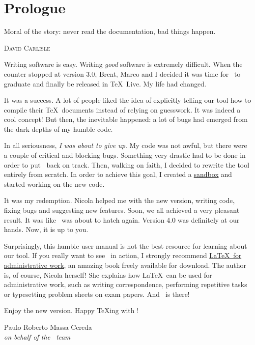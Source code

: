 \chapter*{Prologue}
\label{chap:prologue}

\epigraph{Moral of the story: never read the
documentation, bad things happen.}{\textsc{David Carlisle}}

{\setlength{\parskip}{1em}
Writing software is easy. Writing \emph{good} software is extremely difficult. When the counter stopped at version 3.0, Brent, Marco and I decided it was time for \arara\ to graduate and finally be released in \TeX\ Live. My life had changed.

It was a success. A lot of people liked the idea of explicitly telling our tool how to compile their \TeX\ documents instead of relying on guesswork. It was indeed a cool concept! But then, the inevitable happened: a lot of bugs had emerged from the dark depths of my humble code.

In all seriousness, \emph{I was about to give up}. My code was not awful, but there were a couple of critical and blocking bugs. Something very drastic had to be done in order to put \arara\ back on track. Then, walking on faith, I decided to rewrite the tool entirely from scratch. In order to achieve this goal, I created a \href{https://github.com/cereda/nightingale}{sandbox} and started working on the new code.

It was my redemption. Nicola helped me with the new version, writing code, fixing bugs and suggesting new features. Soon, we all achieved a very pleasant result. It was like \arara\ was about to hatch again. Version 4.0 was definitely at our hands. Now, it is up to you.

Surprisingly, this humble user manual is not the best resource for learning about our tool. If you really want to see \arara\ in action, I strongly recommend \href{https://www.dickimaw-books.com/latex/admin}{\LaTeX\ for administrative work}, an amazing book freely available for download. The author is, of course, Nicola herself! She explains how \LaTeX\ can be used for administrative work, such as writing correspondence, performing repetitive tasks or typesetting problem sheets on exam papers. And \arara\ is there!

Enjoy the new version. Happy \TeX ing with \arara!
\par}

\vfill

\begin{flushright}
Paulo Roberto Massa Cereda\\
\emph{on behalf of the \arara\ team}
\end{flushright}
